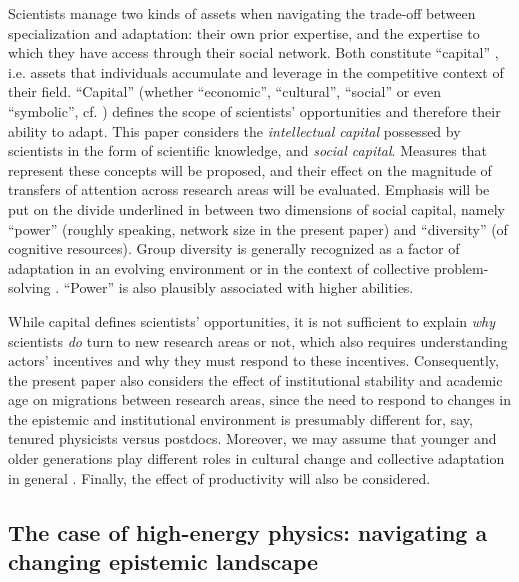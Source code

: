\documentclass{article}
\begin{document}
Scientists manage two kinds of assets when navigating the trade-off between specialization and adaptation: their own prior expertise, and the expertise to which they have access through their social network. Both constitute ``capital'' \citep{Bourdieu1986}, i.e. assets that individuals accumulate and leverage in the competitive context of their field. ``Capital''  (whether ``economic'', ``cultural'', ``social'' or even ``symbolic'', cf. \citealt{Bourdieu1986}) defines the scope of scientists' opportunities and therefore their ability to adapt. This paper considers the \textit{intellectual capital} possessed by scientists in the form of scientific knowledge, and \textit{social capital}. %
Measures that represent these concepts will be proposed, and their effect on the magnitude of transfers of attention across research areas will be evaluated. Emphasis will be put on the divide underlined in \citealt{Abbasi2014} between two dimensions of social capital, namely ``power'' (roughly speaking, network size in the present paper) and ``diversity'' (of cognitive resources). Group diversity is generally recognized as a factor of adaptation in an evolving environment or in the context of collective problem-solving \citep{Smaldino2023,Schimmelpfennig2021,Muthukrishna2016,page2008difference}. ``Power'' is also plausibly associated with higher abilities.

While capital defines scientists' opportunities, it is not sufficient to explain \textit{why} scientists \textit{do} turn to new research areas or not, which also requires understanding actors' incentives and why they must respond to these incentives. Consequently, the present paper also considers the effect of institutional stability and academic age on migrations between research areas, since the need to respond to changes in the epistemic and institutional environment is presumably different for, say, tenured physicists versus postdocs. Moreover, we may assume that younger and older generations play different roles in cultural change and collective adaptation in general \citep{Acerbi2012}. Finally, the effect of productivity will also be considered. %



\subsection{\label{sec:hep}The case of high-energy physics: navigating a changing epistemic landscape}
\end{document}
